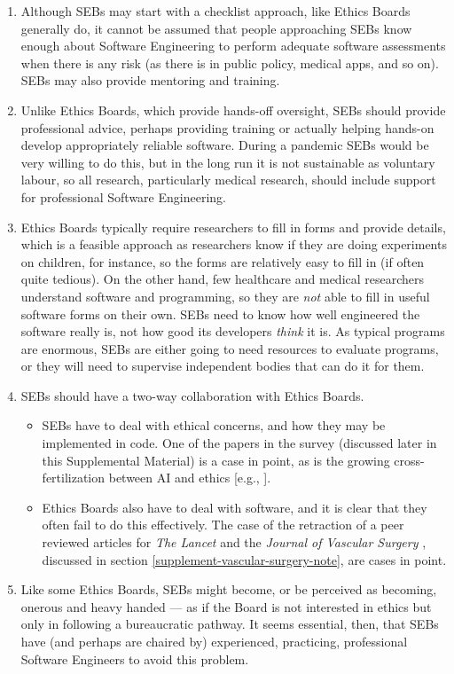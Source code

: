 \documentclass[10pt,a4paper]{article}
\def\supplement{Supplemental Material}
\def\citeeg#1{[e.g., \citenum{#1}]}
\begin{document}
\begin{enumerate}\raggedright
\item 
Although SEBs may start with a checklist approach, like Ethics Boards generally do, it cannot be assumed that people approaching SEBs know enough about Software Engineering to perform adequate software assessments when there is any risk (as there is in public policy, medical apps, and so on). SEBs may also provide mentoring and training.

\item
Unlike Ethics Boards, which provide hands-off oversight, SEBs should provide professional advice, perhaps providing training or actually helping hands-on develop appropriately reliable software. During a pandemic SEBs would be very willing to do this, but in the long run it is not sustainable as voluntary labour, so all research, particularly medical research, should include support for professional Software Engineering. 

\item 
Ethics Boards typically require researchers to fill in forms and provide details, which is a feasible approach as researchers know if they are doing experiments on children, for instance, so the forms are relatively easy to fill in (if often quite tedious). On the other hand, few healthcare and medical researchers understand software and programming, so they are \emph{not\/} able to fill in useful software forms on their own. SEBs need to know how well engineered the software really is, not how good its developers \emph{think\/} it is. As typical programs are enormous, SEBs are either going to need resources to evaluate programs, or they will need to supervise independent bodies that can do it for them. 

\item
SEBs should have a two-way collaboration with Ethics Boards. 

\begin{itemize}
\item SEBs have to deal with ethical concerns, and how they may be implemented in code. One of the papers \cite{ethics-paper} in the survey (discussed later in this \supplement) is a case in point, as is the growing cross-fertilization between AI and ethics \citeeg{ai-ethics}.

\item Ethics Boards also have to deal with software, and it is clear that they often fail to do this effectively. The case of the retraction of a peer reviewed articles for \emph{The Lancet\/} \cite{science-lancet1,science-lancet2,lancet-learning} and the \emph{Journal of Vascular Surgery\/} \cite{jvs1,jvs2,jvs3}, discussed in section 
\ref{supplement-vascular-surgery-note}, are cases in point.
\end{itemize}

\item
Like some Ethics Boards, SEBs might become, or be perceived as becoming, onerous and heavy handed --- as if the Board is not interested in ethics but only in following a bureaucratic pathway. It seems essential, then, that SEBs have (and perhaps are chaired by) experienced, practicing, professional Software Engineers to avoid this problem. 
\end{enumerate}
\end{document}
